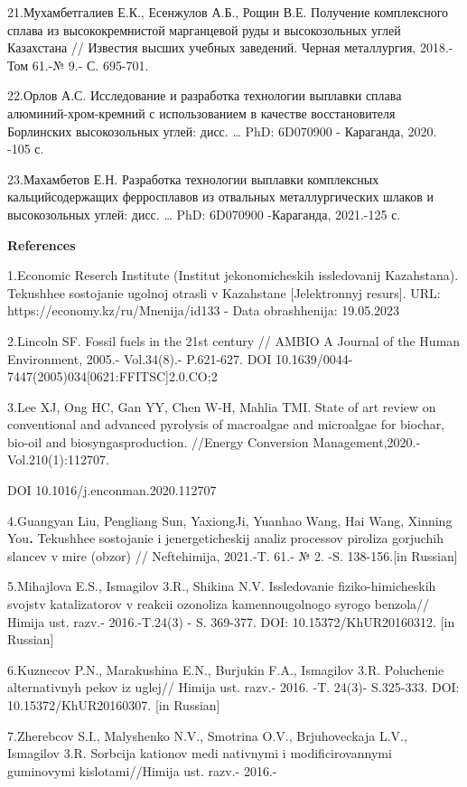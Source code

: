 21.Мухамбетгалиев Е.К., Есенжулов А.Б., Рощин В.Е. Получение
комплексного сплава из высококремнистой марганцевой руды и высокозольных
углей Казахстана // Известия высших учебных заведений. Черная
металлургия, 2018.-Том 61.-№ 9.- С. 695-701.

22.Орлов А.С. Исследование и разработка технологии выплавки сплава
алюминий-хром-кремний с использованием в качестве восстановителя
Борлинских высокозольных углей: дисс. \ldots{} PhD: 6D070900 -
Караганда, 2020. -105 с.

23.Махамбетов Е.Н. Разработка технологии выплавки комплексных
кальцийсодержащих ферросплавов из отвальных металлургических шлаков и
высокозольных углей: дисс. \ldots{} PhD: 6D070900 -Караганда, 2021.-125
с.

\textbf{References}

1.Economic Reserch Institute (Institut jekonomicheskih issledovanij
Kazahstana). Tekushhee sostojanie ugol\textquotesingle noj otrasli v
Kazahstane {[}Jelektronnyj resurs{]}. URL:
https://economy.kz/ru/Mnenija/id133 - Data obrashhenija: 19.05.2023

2.Lincoln SF. Fossil fuels in the 21st century // AMBIO A Journal of the
Human Environment, 2005.- Vol.34(8).- P.621-627. DOI
10.1639/0044-7447(2005)034{[}0621:FFITSC{]}2.0.CO;2

3.Lee XJ, Ong HC, Gan YY, Chen W-H, Mahlia TMI. State of art review on
conventional and advanced pyrolysis of macroalgae and microalgae for
biochar, bio-oil and biosyngasproduction. //Energy Conversion
Management,2020.-Vol.210(1):112707.

DOI 10.1016/j.enconman.2020.112707

4.Guangyan Liu, Pengliang Sun, YaxiongJi, Yuanhao Wang, Hai Wang,
Xinning You\textbf{.} Tekushhee sostojanie i jenergeticheskij analiz
processov piroliza gorjuchih slancev v mire (obzor) // Neftehimija,
2021.-T. 61.- № 2. -S. 138-156.{[}in Russian{]}

5.Mihajlova E.S., Ismagilov 3.R., Shikina N.V. Issledovanie
fiziko-himicheskih svojstv katalizatorov v reakcii ozonoliza
kamennougol\textquotesingle nogo syrogo benzola// Himija ust. razv.-
2016.-T.24(3) - S. 369-377. DOI: 10.15372/KhUR20160312. {[}in Russian{]}

6.Kuznecov P.N., Marakushina E.N., Burjukin F.A., Ismagilov 3.R.
Poluchenie al\textquotesingle ternativnyh pekov iz uglej// Himija ust.
razv.- 2016. -T. 24(3)- S.325-333. DOI: 10.15372/KhUR20160307. {[}in
Russian{]}

7.Zherebcov S.I., Malyshenko N.V., Smotrina O.V., Brjuhoveckaja L.V.,
Ismagilov 3.R. Sorbcija kationov medi nativnymi i modificirovannymi
guminovymi kislotami//Himija ust. razv.- 2016.-

